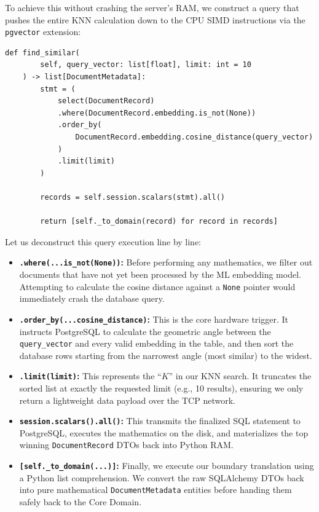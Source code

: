 To achieve this without crashing the server's RAM, we construct a query that pushes the entire KNN calculation down to the CPU SIMD instructions via the \texttt{pgvector} extension:

\begin{lstlisting}[caption={The Repository Adapter: Vector Search Implementation}]
    def find_similar(
        self, query_vector: list[float], limit: int = 10
    ) -> list[DocumentMetadata]:
        stmt = (
            select(DocumentRecord)
            .where(DocumentRecord.embedding.is_not(None))
            .order_by(
                DocumentRecord.embedding.cosine_distance(query_vector)
            )
            .limit(limit)
        )

        records = self.session.scalars(stmt).all()

        return [self._to_domain(record) for record in records]
\end{lstlisting}

Let us deconstruct this query execution line by line:
\begin{itemize}
    \item \textbf{\texttt{.where(...is\_not(None))}:} Before performing any mathematics, we filter out documents that have not yet been processed by the ML embedding model. Attempting to calculate the cosine distance against a \texttt{None} pointer would immediately crash the database query.
    \item \textbf{\texttt{.order\_by(...cosine\_distance)}:} This is the core hardware trigger. It instructs PostgreSQL to calculate the geometric angle between the \texttt{query\_vector} and every valid embedding in the table, and then sort the database rows starting from the narrowest angle (most similar) to the widest.
    \item \textbf{\texttt{.limit(limit)}:} This represents the ``$K$'' in our KNN search. It truncates the sorted list at exactly the requested limit (e.g., 10 results), ensuring we only return a lightweight data payload over the TCP network.
    \item \textbf{\texttt{session.scalars().all()}:} This transmits the finalized SQL statement to PostgreSQL, executes the mathematics on the disk, and materializes the top winning \texttt{DocumentRecord} DTOs back into Python RAM.
    \item \textbf{\texttt{[self.\_to\_domain(...)]}:} Finally, we execute our boundary translation using a Python list comprehension. We convert the raw SQLAlchemy DTOs back into pure mathematical \texttt{DocumentMetadata} entities before handing them safely back to the Core Domain.
\end{itemize}

